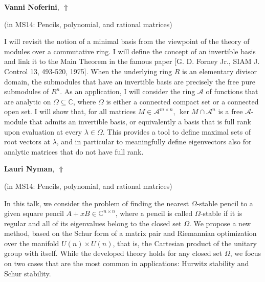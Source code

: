\documentclass[ILAS2025-program.tex]{subfiles}
\begin{document}
\hypertarget{down0213}{}\begin{ilasabstract}
    
\textbf{Vanni Noferini},  \hfill \hyperlink{up0213}{$\Uparrow$}
    
    
(in {\color{mstitle}MS14: Pencils, polynomial, and rational matrices})
        
\mtskip
    I will revisit the notion of a minimal basis from the viewpoint of the theory of modules over a commutative ring. I will define the concept of an invertible basis and link it to the Main Theorem in the famous paper [G. D. Forney Jr., SIAM J. Control 13, 493-520, 1975]. When the underlying ring $R$ is an elementary divisor domain, the submodules that have an invertible basis are precisely the free pure submodules of $R^n$. As an application, I will consider the ring $\mathcal{A}$ of functions that are analytic on $\Omega \subseteq \mathbb{C}$, where $\Omega$ is either a connected compact set or a connected open set. I will show that, for all matrices $M \in \mathcal{A}^{m \times n}$, $\ker M \cap \mathcal{A}^n$ is a free $\mathcal{A}$-module that admits an invertible basis, or equivalently a basis that is full rank upon evaluation at every $\lambda \in \Omega$. This provides a tool to define maximal sets of root vectors at $\lambda$, and in particular to meaningfully define eigenvectors also for analytic matrices that do not have full rank.

\end{ilasabstract}
    

\hypertarget{down0327}{}\begin{ilasabstract}
    
\textbf{Lauri Nyman},  \hfill \hyperlink{up0327}{$\Uparrow$}
    
    
(in {\color{mstitle}MS14: Pencils, polynomial, and rational matrices})
        
\mtskip
    In this talk, we consider the problem of finding the nearest $\Omega$-stable pencil to a given square pencil $A+xB \in \mathbb{C}^{n \times n}$, where a pencil is called $\Omega$-stable if it is regular and all of its eigenvalues belong to the closed set $\Omega$. We propose a new method, based on the Schur form of a matrix pair and Riemannian optimization over the manifold $U(n) \times U(n)$, that is, the Cartesian product of the unitary group with itself. While the developed theory holds for any closed set $\Omega$, we focus on two cases that are the most common in applications: Hurwitz stability and Schur stability. 

\end{ilasabstract}
    
\end{document}
